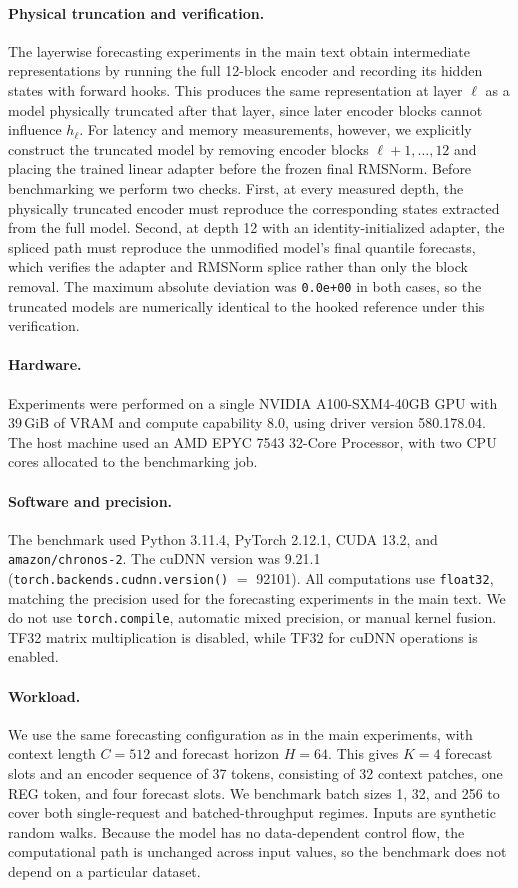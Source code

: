 \documentclass{article}
\begin{document}
\paragraph{Physical truncation and verification.}
The layerwise forecasting experiments in the main text obtain intermediate representations by running the full 12-block encoder and recording its hidden states with forward hooks. This produces the same representation at layer \(\ell\) as a model physically truncated after that layer, since later encoder blocks cannot influence \(h_\ell\). For latency and memory measurements, however, we explicitly construct the truncated model by removing encoder blocks \(\ell+1,\ldots,12\) and placing the trained linear adapter before the frozen final RMSNorm. Before benchmarking we perform two checks. First, at every measured depth, the physically truncated encoder must reproduce the corresponding states extracted from the full model. Second, at depth 12 with an identity-initialized adapter, the spliced path must reproduce the unmodified model's final quantile forecasts, which verifies the adapter and RMSNorm splice rather than only the block removal. The maximum absolute deviation was \texttt{0.0e+00} in both cases, so the truncated models are numerically identical to the hooked reference under this verification.

\paragraph{Hardware.}
Experiments were performed on a single NVIDIA A100-SXM4-40GB GPU with 39\,GiB of VRAM and compute capability 8.0, using driver version 580.178.04. The host machine used an AMD EPYC 7543 32-Core Processor, with two CPU cores allocated to the benchmarking job.

\paragraph{Software and precision.}
The benchmark used Python 3.11.4, PyTorch 2.12.1, CUDA 13.2, and \texttt{amazon/chronos-2}. The cuDNN version was 9.21.1 (\texttt{torch.backends.cudnn.version()} \(=\) 92101). All computations use \texttt{float32}, matching the precision used for the forecasting experiments in the main text. We do not use \texttt{torch.compile}, automatic mixed precision, or manual kernel fusion. TF32 matrix multiplication is disabled, while TF32 for cuDNN operations is enabled.

\paragraph{Workload.}
We use the same forecasting configuration as in the main experiments, with context length \(C=512\) and forecast horizon \(H=64\). This gives \(K=4\) forecast slots and an encoder sequence of 37 tokens, consisting of 32 context patches, one REG token, and four forecast slots. We benchmark batch sizes 1, 32, and 256 to cover both single-request and batched-throughput regimes. Inputs are synthetic random walks. Because the model has no data-dependent control flow, the computational path is unchanged across input values, so the benchmark does not depend on a particular dataset.
\end{document}
